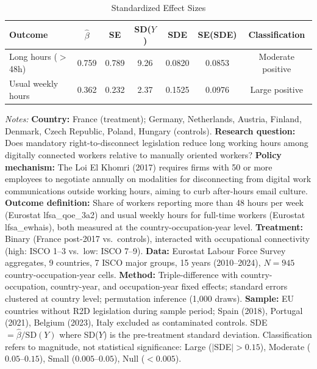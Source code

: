 \begin{table}[htbp]
\centering
\caption{Standardized Effect Sizes}
\label{tab:sde}
\begin{tabular}{lcccccc}
\toprule
Outcome & $\hat{\beta}$ & SE & SD($Y$) & SDE & SE(SDE) & Classification \\
\midrule
Long hours ($>$48h) & 0.759 & 0.789 & 9.26 & 0.0820 & 0.0853 & Moderate positive \\
Usual weekly hours & 0.362 & 0.232 & 2.37 & 0.1525 & 0.0976 & Large positive \\
\bottomrule
\end{tabular}
\begin{tablenotes}
\small
\item \textit{Notes:} \textbf{Country:} France (treatment); Germany, Netherlands, Austria, Finland, Denmark, Czech Republic, Poland, Hungary (controls). \textbf{Research question:} Does mandatory right-to-disconnect legislation reduce long working hours among digitally connected workers relative to manually oriented workers? \textbf{Policy mechanism:} The Loi El Khomri (2017) requires firms with 50 or more employees to negotiate annually on modalities for disconnecting from digital work communications outside working hours, aiming to curb after-hours email culture. \textbf{Outcome definition:} Share of workers reporting more than 48 hours per week (Eurostat lfsa\_qoe\_3a2) and usual weekly hours for full-time workers (Eurostat lfsa\_ewhais), both measured at the country-occupation-year level. \textbf{Treatment:} Binary (France post-2017 vs.\ controls), interacted with occupational connectivity (high: ISCO 1--3 vs.\ low: ISCO 7--9). \textbf{Data:} Eurostat Labour Force Survey aggregates, 9 countries, 7 ISCO major groups, 15 years (2010--2024), $N = 945$ country-occupation-year cells. \textbf{Method:} Triple-difference with country-occupation, country-year, and occupation-year fixed effects; standard errors clustered at country level; permutation inference (1,000 draws). \textbf{Sample:} EU countries without R2D legislation during sample period; Spain (2018), Portugal (2021), Belgium (2023), Italy excluded as contaminated controls. SDE $= \hat{\beta} / \text{SD}(Y)$ where SD($Y$) is the pre-treatment standard deviation. Classification refers to magnitude, not statistical significance: Large ($|$SDE$| > 0.15$), Moderate ($0.05$--$0.15$), Small ($0.005$--$0.05$), Null ($< 0.005$).
\end{tablenotes}
\end{table}
